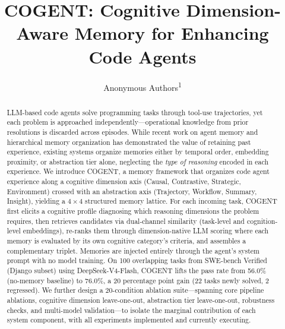 \documentclass[letterpaper]{article} %
\title{COGENT: Cognitive Dimension-Aware Memory for Enhancing Code Agents}
\author{
    Anonymous Authors\textsuperscript{\rm 1}
}
\begin{document}
\maketitle

\begin{abstract}
LLM-based code agents solve programming tasks through tool-use trajectories, yet each problem is approached independently---operational knowledge from prior resolutions is discarded across episodes. While recent work on agent memory \cite{expel, reflexion, memgpt} and hierarchical memory organization \cite{g-memory, evolve-mem} has demonstrated the value of retaining past experience, existing systems organize memories either by temporal order, embedding proximity, or abstraction tier alone, neglecting the \emph{type of reasoning} encoded in each experience. We introduce \textsc{COGENT}, a memory framework that organizes code agent experience along a cognitive dimension axis (Causal, Contrastive, Strategic, Environment) crossed with an abstraction axis (Trajectory, Workflow, Summary, Insight), yielding a $4 \times 4$ structured memory lattice. For each incoming task, \textsc{COGENT} first elicits a cognitive profile diagnosing which reasoning dimensions the problem requires, then retrieves candidates via dual-channel similarity (task-level and cognition-level embeddings), re-ranks them through dimension-native LLM scoring where each memory is evaluated by its own cognitive category's criteria, and assembles a complementary triplet. Memories are injected entirely through the agent's system prompt with no model training. On 100 overlapping tasks from SWE-bench Verified (Django subset) using DeepSeek-V4-Flash, \textsc{COGENT} lifts the pass rate from 56.0\% (no-memory baseline) to 76.0\%, a 20 percentage point gain (22 tasks newly solved, 2 regressed). We further design a 20-condition ablation suite---spanning core pipeline ablations, cognitive dimension leave-one-out, abstraction tier leave-one-out, robustness checks, and multi-model validation---to isolate the marginal contribution of each system component, with all experiments implemented and currently executing.
\end{abstract}

\begin{links}
\end{links}
\end{document}
